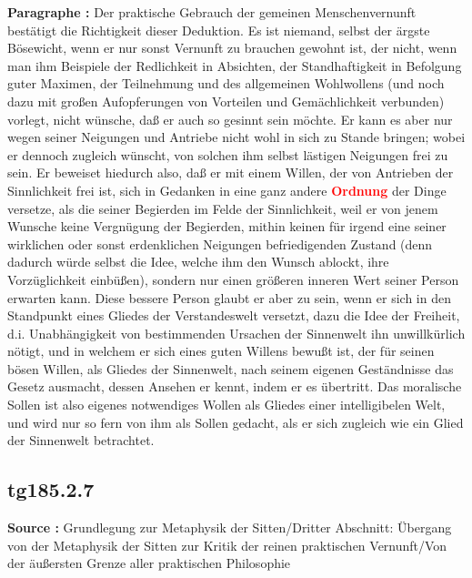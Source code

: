 \documentclass[a4paper,12pt,twoside]{book}
\newcommand{\match}[1]{\textcolor{red}{\textbf{#1}}}
\begin{document}
	\noindent\textbf{Paragraphe : }Der praktische Gebrauch der gemeinen Menschenvernunft bestätigt die Richtigkeit dieser Deduktion. Es ist niemand, selbst der ärgste Bösewicht, wenn er nur sonst Vernunft  zu brauchen gewohnt ist, der nicht, wenn man ihm Beispiele der Redlichkeit in Absichten, der Standhaftigkeit in Befolgung guter Maximen, der Teilnehmung und des allgemeinen Wohlwollens (und noch dazu mit großen Aufopferungen von Vorteilen und Gemächlichkeit verbunden) vorlegt, nicht wünsche, daß er auch so gesinnt sein möchte. Er kann es aber nur wegen seiner Neigungen und Antriebe nicht wohl in sich zu Stande bringen; wobei er dennoch zugleich wünscht, von solchen ihm selbst lästigen Neigungen frei zu sein. Er beweiset hiedurch also, daß er mit einem Willen, der von Antrieben der Sinnlichkeit frei ist, sich in Gedanken in eine ganz andere \match{Ordnung} der Dinge versetze, als die seiner Begierden im Felde der Sinnlichkeit, weil er von jenem Wunsche keine Vergnügung der Begierden, mithin keinen für irgend eine seiner wirklichen oder sonst erdenklichen Neigungen befriedigenden Zustand (denn dadurch würde selbst die Idee, welche ihm den Wunsch ablockt, ihre Vorzüglichkeit einbüßen), sondern nur einen größeren inneren Wert seiner Person erwarten kann. Diese bessere Person glaubt er aber zu sein, wenn er sich in den Standpunkt eines Gliedes der Verstandeswelt versetzt, dazu die Idee der Freiheit, d.i. Unabhängigkeit von bestimmenden Ursachen der Sinnenwelt ihn unwillkürlich nötigt, und in welchem er sich eines guten Willens bewußt ist, der für seinen bösen Willen, als Gliedes der Sinnenwelt, nach seinem eigenen Geständnisse das Gesetz ausmacht, dessen Ansehen er kennt, indem er es übertritt. Das moralische Sollen ist also eigenes notwendiges Wollen als Gliedes einer intelligibelen Welt, und wird nur so fern von ihm als Sollen gedacht, als er sich zugleich wie ein Glied der Sinnenwelt betrachtet. 
	
	\subsection*{tg185.2.7} 
	\textbf{Source : }Grundlegung zur Metaphysik der Sitten/Dritter Abschnitt: Übergang von der Metaphysik der Sitten zur Kritik der reinen praktischen Vernunft/Von der äußersten Grenze aller praktischen Philosophie\\  
	
\end{document}
